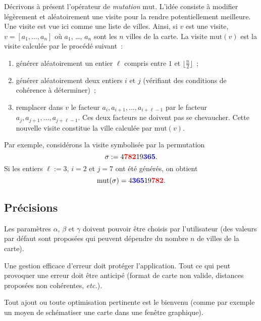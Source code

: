 \documentclass[12pt]{article}
\theoremstyle{definition}
\newcommand{\Mut}{\mathrm{mut}}
\begin{document}
Décrivons à présent l'opérateur de {\em mutation} $\Mut$. L'idée
consiste à modifier légèrement et aléatoirement une visite pour la
rendre potentiellement meilleure. Une visite est vue ici comme une liste
de villes. Ainsi, si $v$ est une visite, $v = [a_1, \dots, a_n]$ où
$a_1$, \dots, $a_n$ sont les $n$ villes de la carte. La visite $\Mut(v)$
est la visite calculée par le procédé suivant~:
\begin{enumerate}
    \item générer aléatoirement un entier $\ell$ compris entre $1$
    et $\lfloor\frac{n}{2}\rfloor$~;
    \smallskip

    \item générer aléatoirement deux entiers $i$ et $j$ (vérifiant des
    conditions de cohérence à déterminer)~;
    \smallskip

    \item remplacer dans $v$ le facteur
    $a_i, a_{i + 1}, \dots, a_{i + \ell - 1}$ par le facteur
    $a_j, a_{j + 1}, \dots, a_{j + \ell - 1}$. Ces deux facteurs ne
    doivent pas se chevaucher. Cette nouvelle
    visite constitue la ville calculée par $\Mut(v)$.
\end{enumerate}
Par exemple, considérons la visite symbolisée par la permutation
\begin{equation*}
    \sigma := 4 \textcolor{red}{\bf 782} 19 \textcolor{blue}{\bf 365}.
\end{equation*}
Si les entiers $\ell := 3$, $i = 2$ et $j = 7$ ont été générés,
on obtient
\begin{equation*}
    \Mut(\sigma) =
    4 \textcolor{blue}{\bf 365} 19 \textcolor{red}{\bf 782}.
\end{equation*}
\medskip

\subsection*{\centering Précisions}
Les paramètres $\alpha$, $\beta$ et $\gamma$ doivent pouvoir être
choisis par l'utilisateur (des valeurs par défaut sont proposées qui
peuvent dépendre du nombre $n$ de villes de la carte).
\medskip

Une gestion efficace d'erreur doit protéger l'application. Tout ce qui
peut provoquer une erreur doit être anticipé (format de carte non valide,
distances proposées non cohérentes, {\em etc.}).
\medskip

Tout ajout ou toute optimisation pertinente est le bienvenu (comme par
exemple un moyen de schématiser une carte dans une fenêtre graphique).
\bigskip
\end{document}
